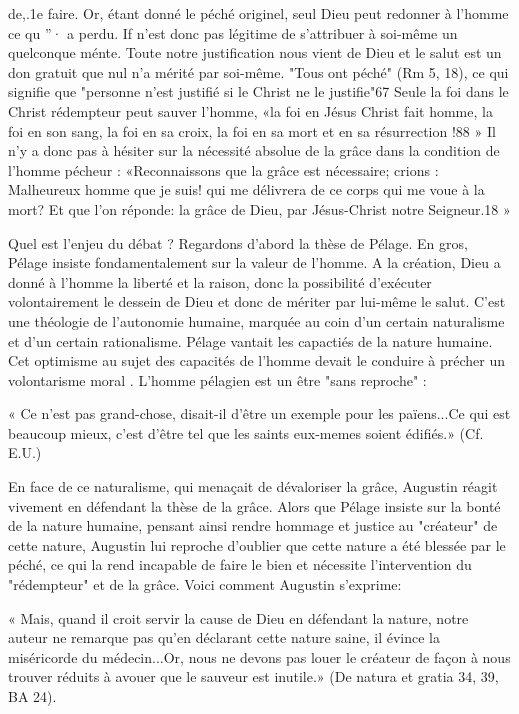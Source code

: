de,.1e faire. Or, étant donné le péché originel, seul Dieu peut redonner à l'homme ce qu ''· a perdu. If n'est donc pas légitime de s'attribuer à soi-même un quelconque ménte. Toute notre justification nous vient de Dieu et le salut est un don gratuit que nul n'a mérité par soi-même. "Tous ont péché" (Rm 5, 18), ce qui signifie que "personne n'est justifié si le Christ ne le justifie"67   Seule la foi dans le Christ rédempteur peut sauver l'homme, «la foi en Jésus Christ fait homme, la foi en son sang, la foi en sa croix, la foi en sa mort et en sa résurrection !88 » Il n'y a donc pas à hésiter sur la nécessité absolue de la grâce dans la condition de l'homme pécheur :
«Reconnaissons que la grâce est nécessaire; crions : Malheureux homme que je suis! qui me délivrera de ce corps qui me voue à la mort? Et que l'on réponde: la grâce de Dieu, par Jésus-Christ notre Seigneur.18 »

Quel est l'enjeu du débat ? Regardons d'abord la thèse	de Pélage. En gros, Pélage insiste fondamentalement sur la valeur de l'homme. A la création, Dieu a donné à l'homme la liberté et la raison, donc la possibilité d'exécuter volontairement le dessein de Dieu et donc de mériter par lui-même le salut. C'est une théologie de l'autonomie humaine, marquée au coin d'un certain naturalisme et d'un certain rationalisme. Pélage vantait les capactiés de la nature humaine. Cet optimisme au sujet des capacités de l'homme devait le conduire	à précher un volontarisme moral . L'homme pélagien est un être "sans reproche" :

« Ce n'est pas grand-chose, disait-il d'être un exemple pour les païens...Ce qui est beaucoup mieux, c'est d'être tel que les saints eux-memes soient édifiés.» (Cf. E.U.)

En face de ce naturalisme, qui menaçait de dévaloriser la grâce, Augustin réagit vivement en défendant la thèse de la grâce. Alors que Pélage insiste sur la bonté de la nature humaine, pensant ainsi rendre hommage et justice au "créateur" de cette nature, Augustin lui reproche d'oublier que cette nature a été blessée par le péché, ce qui la rend incapable de faire le bien et nécessite l'intervention du "rédempteur" et de la grâce. Voici comment Augustin s'exprime:

« Mais, quand il croit servir la cause de Dieu en défendant la nature, notre auteur ne remarque pas qu'en déclarant cette nature saine, il évince la miséricorde du médecin...Or, nous ne devons pas louer le créateur de façon à nous trouver réduits à avouer que le sauveur est inutile.» (De natura et gratia 34, 39, BA 24).

